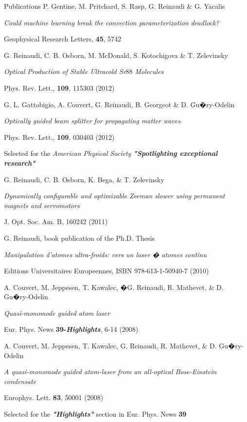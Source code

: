 \begin{rubric}{Publications}
\entry*[2018]%
P. Gentine, M. Pritchard, S. Rasp, G. Reinaudi \& G. Yacalis
\par{
\emph{Could machine learning break the convection parameterization deadlock?}
\par{
Geophysical Research Letters,  \textbf{45}, 5742
}}%
%
\entry*[2012]%
G. Reinaudi, C. B. Osborn, M. McDonald, S. Kotochigova \& T. Zelevinsky
\par{
\emph{Optical Production of Stable Ultracold Sr$88$ Molecules}
\par{
Phys. Rev. Lett.,  \textbf{109}, 115303 (2012)
}}%
%
\entry*[2012]%
G. L. Gattobigio, A. Couvert, G. Reinaudi, B. Georgeot \& D. Gu�ry-Odelin
\par{
\emph{Optically guided beam splitter for propagating matter waves}
\par{
Phys. Rev. Lett.,  \textbf{109}, 030403 (2012)
\par{Selected for the \textit{American Physical Society \textbf{"Spotlighting exceptional research"}}}
}}%
%
\entry*[2011]%
G. Reinaudi, C. B. Osborn, K. Bega, \& T. Zelevinsky
\par{
\emph{Dynamically configurable and optimizable Zeeman slower using permanent magnets and servomotors}
\par{
J. Opt. Soc. Am. B, 160242 (2011)
}}%
%
\entry*[2010]%
G. Reinaudi, book publication of the Ph.D. Thesis 
\par{
\emph{Manipulation d'atomes ultra-froids: vers un laser � atomes continu 
}
\par{
Editions Universitaires Europeennes, ISBN 978-613-1-50940-7 (2010)
}}
%
%
\entry*[2008]%
A. Couvert, M. Jeppesen, T. Kawalec, �G. Reinaudi, R. Mathevet, \& D. Gu�ry-Odelin 
\par{
\emph{Quasi-monomode guided atom laser}
\par{
Eur. Phys. News \textbf{39-\textit{Highlights}}, 6-14 (2008)
}}
%
%
\entry*[2008]%
A. Couvert, M. Jeppesen, T. Kawalec, G. Reinaudi, R. Mathevet,  \& D. Gu�ry-Odelin
\par{
\emph{A quasi-monomode guided atom-laser from an all-optical Bose-Einstein condensate}
\par{
Europhys. Lett. \textbf{83}, 50001 (2008)
\par{Selected for the \textbf{\textit{"Highlights"}} section in Eur. Phys. News \textbf{39}}
}}
%
%

\end{rubric}
